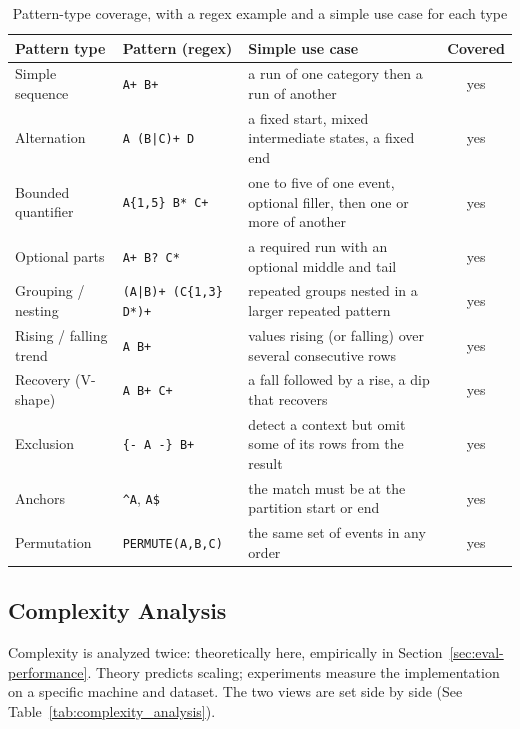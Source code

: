 \begin{table}[H]
\centering
\caption[Pattern-type coverage]{Pattern-type coverage, with a regex example and a simple use
  case for each type}
\label{tab:pattern_type_coverage}
{\small
\setlength{\tabcolsep}{4pt}
\begin{tabularx}{\textwidth}{l l >{\raggedright\arraybackslash}X c}
\toprule
\textbf{Pattern type} & \textbf{Pattern (regex)} &
  \textbf{Simple use case} & \textbf{Covered} \\
\midrule
Simple sequence & \texttt{A+ B+} &
  a run of one category then a run of another & yes \\
Alternation & \texttt{A (B|C)+ D} &
  a fixed start, mixed intermediate states, a fixed end & yes \\
Bounded quantifier & \texttt{A\{1,5\} B* C+} &
  one to five of one event, optional filler, then one or more of
  another & yes \\
Optional parts & \texttt{A+ B? C*} &
  a required run with an optional middle and tail & yes \\
Grouping / nesting & \texttt{(A|B)+ (C\{1,3\} D*)+} &
  repeated groups nested in a larger repeated pattern & yes \\
Rising / falling trend & \texttt{A B+} &
  values rising (or falling) over several consecutive rows & yes \\
Recovery (V-shape) & \texttt{A B+ C+} &
  a fall followed by a rise, a dip that recovers & yes \\
Exclusion & \texttt{\{- A -\} B+} &
  detect a context but omit some of its rows from the result & yes \\
Anchors & \texttt{\^{}A}, \texttt{A\$} &
  the match must be at the partition start or end & yes \\
Permutation & \texttt{PERMUTE(A,B,C)} &
  the same set of events in any order & yes \\
\bottomrule
\end{tabularx}
}
\end{table}

\subsection{Complexity Analysis}
\label{subsec:eval-complexity}

Complexity is analyzed twice: theoretically here, empirically in
Section~\ref{sec:eval-performance}.  Theory predicts scaling;
experiments measure the implementation on a specific machine and
dataset.  The two views are set side by side (See
Table~\ref{tab:complexity_analysis}).

